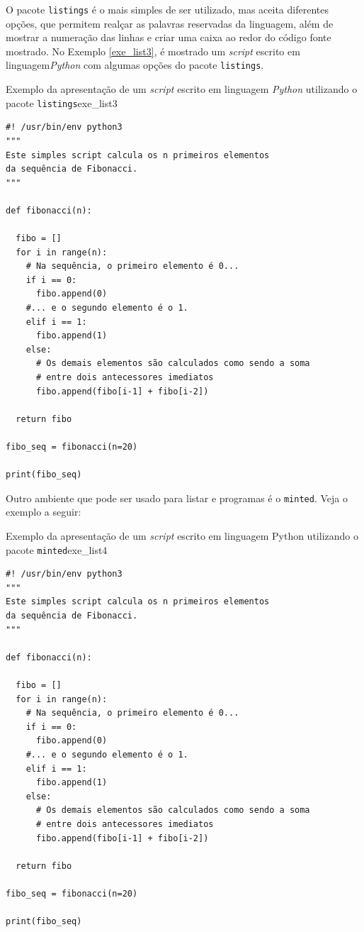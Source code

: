 O pacote {\tt listings} é o mais simples de ser utilizado, mas aceita diferentes opções, que permitem realçar as palavras reservadas da linguagem, além de mostrar a numeração das linhas e criar uma caixa ao redor do código fonte mostrado. No Exemplo \ref{exe_list3}, é mostrado um \textit{script} escrito em linguagem\textit{Python} com algumas opções do pacote {\tt listings}.

\begin{texexptitled}[breakable,center lower,enhanced,middle=2mm]{Exemplo da apresentação de um \textit{script} escrito em linguagem \textit{Python} utilizando o pacote {\tt listings}}{exe_list3}
\begin{lstlisting}
#! /usr/bin/env python3
"""
Este simples script calcula os n primeiros elementos
da sequência de Fibonacci.
"""

def fibonacci(n):

  fibo = []
  for i in range(n):
    # Na sequência, o primeiro elemento é 0...
    if i == 0:
      fibo.append(0)
    #... e o segundo elemento é o 1.
    elif i == 1:
      fibo.append(1)
    else:
      # Os demais elementos são calculados como sendo a soma
      # entre dois antecessores imediatos
      fibo.append(fibo[i-1] + fibo[i-2])

  return fibo

fibo_seq = fibonacci(n=20)

print(fibo_seq)
\end{lstlisting}
\end{texexptitled}

Outro ambiente que pode ser usado para listar  e programas é o {\tt minted}. Veja o exemplo a seguir:

\begin{texexptitled}[breakable,center lower,enhanced,middle=2mm,leftlower=8mm]{Exemplo da apresentação de um \textit{script} escrito em linguagem Python utilizando o pacote {\tt minted}}{exe_list4}
\begin{verbatim}
#! /usr/bin/env python3
"""
Este simples script calcula os n primeiros elementos
da sequência de Fibonacci.
"""

def fibonacci(n):

  fibo = []
  for i in range(n):
    # Na sequência, o primeiro elemento é 0...
    if i == 0:
      fibo.append(0)
    #... e o segundo elemento é o 1.
    elif i == 1:
      fibo.append(1)
    else:
      # Os demais elementos são calculados como sendo a soma
      # entre dois antecessores imediatos
      fibo.append(fibo[i-1] + fibo[i-2])

  return fibo

fibo_seq = fibonacci(n=20)

print(fibo_seq)
\end{verbatim}
\end{texexptitled}

